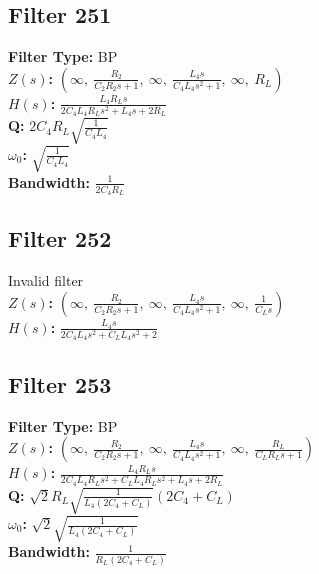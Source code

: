 \documentclass{article}
\begin{document}
\subsection*{Filter 251}
\textbf{Filter Type:} BP \\ 
\textbf{$Z(s)$:} $\left( \infty, \  \frac{R_{2}}{C_{2} R_{2} s + 1}, \  \infty, \  \frac{L_{4} s}{C_{4} L_{4} s^{2} + 1}, \  \infty, \  R_{L}\right)$ \\ 
\textbf{$H(s)$:} $\frac{L_{4} R_{L} s}{2 C_{4} L_{4} R_{L} s^{2} + L_{4} s + 2 R_{L}}$ \\ 
\textbf{Q:} $2 C_{4} R_{L} \sqrt{\frac{1}{C_{4} L_{4}}}$ \\ 
\textbf{$\omega_0$:} $\sqrt{\frac{1}{C_{4} L_{4}}}$ \\ 
\textbf{Bandwidth:} $\frac{1}{2 C_{4} R_{L}}$ \\ 
\subsection*{Filter 252}
Invalid filter \\ 
\textbf{$Z(s)$:} $\left( \infty, \  \frac{R_{2}}{C_{2} R_{2} s + 1}, \  \infty, \  \frac{L_{4} s}{C_{4} L_{4} s^{2} + 1}, \  \infty, \  \frac{1}{C_{L} s}\right)$ \\ 
\textbf{$H(s)$:} $\frac{L_{4} s}{2 C_{4} L_{4} s^{2} + C_{L} L_{4} s^{2} + 2}$ \\ 
\subsection*{Filter 253}
\textbf{Filter Type:} BP \\ 
\textbf{$Z(s)$:} $\left( \infty, \  \frac{R_{2}}{C_{2} R_{2} s + 1}, \  \infty, \  \frac{L_{4} s}{C_{4} L_{4} s^{2} + 1}, \  \infty, \  \frac{R_{L}}{C_{L} R_{L} s + 1}\right)$ \\ 
\textbf{$H(s)$:} $\frac{L_{4} R_{L} s}{2 C_{4} L_{4} R_{L} s^{2} + C_{L} L_{4} R_{L} s^{2} + L_{4} s + 2 R_{L}}$ \\ 
\textbf{Q:} $\sqrt{2} R_{L} \sqrt{\frac{1}{L_{4} \left(2 C_{4} + C_{L}\right)}} \left(2 C_{4} + C_{L}\right)$ \\ 
\textbf{$\omega_0$:} $\sqrt{2} \sqrt{\frac{1}{L_{4} \left(2 C_{4} + C_{L}\right)}}$ \\ 
\textbf{Bandwidth:} $\frac{1}{R_{L} \left(2 C_{4} + C_{L}\right)}$ \\ 
\end{document}
